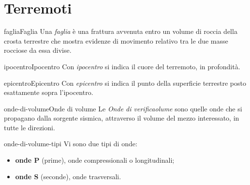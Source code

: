 \documentclass[preview]{standalone}
\begin{document}
\genpage


\section{Terremoti}


\begin{snippetdefinition}{faglia}{Faglia}
    Una \textit{faglia} è una frattura avvenuta entro
    un volume di roccia della crosta terrestre che mostra evidenze di
    movimento relativo tra le due masse rocciose da essa divise.
\end{snippetdefinition}

\begin{snippetdefinition}{ipocentro}{Ipocentro}
    Con \textit{ipocentro} si indica il cuore del terremoto, in profondità.
\end{snippetdefinition}

\begin{snippetdefinition}{epicentro}{Epicentro}
    Con \textit{epicentro} si indica il punto della superficie terrestre posto esattamente sopra l'ipocentro.
\end{snippetdefinition}


\begin{snippetdefinition}{onde-di-volume}{Onde di volume}
    Le \textit{Onde di verificaolume} sono quelle onde che si propagano dalla sorgente sismica,
    attraverso il volume del mezzo interessato, in tutte le direzioni.
\end{snippetdefinition}

\begin{snippet}{onde-di-volume-tipi}
    Vi sono due tipi di onde:
    \begin{itemize}
        \item \textbf{onde P} (prime), onde compressionali o longitudinali;
        \item \textbf{onde S} (seconde), onde trasversali.
    \end{itemize}
\end{snippet}

\end{document}
